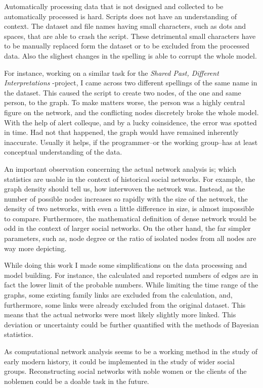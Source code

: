 Automatically processing data that is not designed and collected to be automatically processed is hard. Scripts does not have an understanding of context. The dataset and file names having small characters, such as dots and spaces, that are able to crash the script. These detrimental small characters have to be manually replaced form the dataset or to be excluded from the processed data. Also the slighest changes in the spelling is able to corrupt the whole model.

For instance, working on a similar task for the \textit{Shared Past, Different Interpretations} -project, I came across two different spellings of the same name in the dataset. This caused the script to create two nodes, of the one and same person, to the graph. To make matters worse, the person was a highly central figure on the network, and the conflicting nodes discretely broke the whole model. With the help of alert colleque, and by a lucky coinsidence, the error was spotted in time. Had not that happened, the graph would have remained inherently inaccurate. Usually it helps, if the programmer–or the working group–has at least conceptual understanding of the data. 

An important observation concerning the actual network analysis is; which statistics are usable in the context of historical social networks. For example, the graph density should tell us, how interwoven the network was. Instead, as the number of possible nodes increases so rapidly with the size of the network, the density of two networks, with even a little difference in size, is almost impossible to compare. Furthermore, the mathematical definition of dense network would be odd in the context of larger social networks. On the other hand, the far simpler parameters, such as, node degree or the ratio of isolated nodes from all nodes are way more depicting. 

While doing this work I made some simplifications on the data processing and model building. For instance, the calculated and reported numbers of edges are in fact the lower limit of the probable numbers. While limiting the time range of the graphs, some existing family links are excluded from the calculation, and, furthermore, some links were already excluded from the original dataset. This means that the actual networks were most likely slightly more linked. This deviation or uncertainty could be further quantified with the methods of Bayesian statistics.
 
As computational network analysis seems to be a working method in the study of early modern history, it could be implemented in the study of wider social groups. Reconstructing social networks with noble women or the clients of the noblemen could be a doable task in the future.

